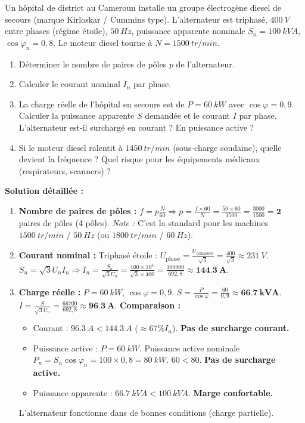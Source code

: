 \documentclass[11pt]{article}
\begin{document}
\begin{exoresolu}
Un hôpital de district au Cameroun installe un groupe électrogène diesel de secours (marque Kirloskar / Cummins type). L'alternateur est triphasé, $\SI{400}{V}$ entre phases (régime étoile), $\SI{50}{Hz}$, puissance apparente nominale $S_n = \SI{100}{kVA}$, $\cos\varphi_n = 0,8$. Le moteur diesel tourne à $N = \SI{1500}{tr/min}$.
\begin{enumerate}
    \item Déterminer le nombre de paires de pôles $p$ de l'alternateur.
    \item Calculer le courant nominal $I_n$ par phase.
    \item La charge réelle de l'hôpital en secours est de $P = \SI{60}{kW}$ avec $\cos\varphi = 0,9$. Calculer la puissance apparente $S$ demandée et le courant $I$ par phase. L'alternateur est-il surchargé en courant ? En puissance active ?
    \item Si le moteur diesel ralentit à $\SI{1450}{tr/min}$ (sous-charge soudaine), quelle devient la fréquence ? Quel risque pour les équipements médicaux (respirateurs, scanners) ?
\end{enumerate}
\tcblower
\textbf{Solution détaillée :}
\begin{enumerate}
    \item \textbf{Nombre de paires de pôles :}
    $f = p \frac{N}{60} \Rightarrow p = \frac{f \times 60}{N} = \frac{50 \times 60}{1500} = \frac{3000}{1500} = \mathbf{2}$ paires de pôles (4 pôles).
    \textit{Note :} C'est la standard pour les machines $\SI{1500}{tr/min}$ / $\SI{50}{Hz}$ (ou $\SI{1800}{tr/min}$ / $\SI{60}{Hz}$).
    
    \item \textbf{Courant nominal :}
    Triphasé étoile : $U_{\text{phase}} = \frac{U_{\text{composée}}}{\sqrt{3}} = \frac{400}{\sqrt{3}} \approx \SI{231}{V}$.
    $S_n = \sqrt{3} U_n I_n \Rightarrow I_n = \frac{S_n}{\sqrt{3} U_n} = \frac{100 \times 10^3}{\sqrt{3} \times 400} = \frac{100000}{692,8} \approx \mathbf{\SI{144,3}{A}}$.
    
    \item \textbf{Charge réelle :}
    $P = \SI{60}{kW}$, $\cos\varphi = 0,9$.
    $S = \frac{P}{\cos\varphi} = \frac{60}{0,9} \approx \mathbf{\SI{66,7}{kVA}}$.
    $I = \frac{S}{\sqrt{3} U_n} = \frac{66700}{692,8} \approx \mathbf{\SI{96,3}{A}}$.
    \textbf{Comparaison :}
    \begin{itemize}
        \item Courant : $\SI{96,3}{A} < \SI{144,3}{A}$ ($\approx 67\% I_n$). \textbf{Pas de surcharge courant.}
        \item Puissance active : $P = \SI{60}{kW}$. Puissance active nominale $P_n = S_n \cos\varphi_n = 100 \times 0,8 = \SI{80}{kW}$. $60 < 80$. \textbf{Pas de surcharge active.}
        \item Puissance apparente : $\SI{66,7}{kVA} < \SI{100}{kVA}$. \textbf{Marge confortable.}
    \end{itemize}
    L'alternateur fonctionne dans de bonnes conditions (charge partielle).
    

\end{enumerate}
\end{exoresolu}
\end{document}
